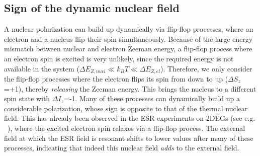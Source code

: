 \documentclass[12pt,aps,nofootinbib]{revtex4-1}
\begin{document}
\subsection{Sign of the dynamic nuclear field}
A nuclear polarization can build up dynamically via flip-flop
processes, where an electron and a nucleus flip their spin
simultaneously. Because of the large energy mismatch between
nuclear and electron Zeeman energy, a flip-flop process where an
electron spin is excited is very unlikely, since the required
energy is not available in the system ($\Delta
E_{Z,nucl}\!\ll\!k_BT\!\ll\!\Delta E_{Z,el}$). Therefore, we only
consider the flip-flop processes where the electron flips its spin
from down to up ($\Delta S_z$=+1), thereby \textit{releasing} the
Zeeman energy. This brings the nucleus to a different spin state
with $\Delta I_z$=-1. Many of these processes can dynamically
build up a considerable polarization, whose sign is opposite to
that of the thermal nuclear field. This has already been observed
in the ESR experiments on 2DEGs (see e.g. ~\textcite{dobers88}),
where the excited electron spin relaxes via a flip-flop process.
The external field at which the ESR field is resonant shifts to
lower values after many of these processes, indicating that indeed
this nuclear field \textit{adds} to the external field.



\end{document}
